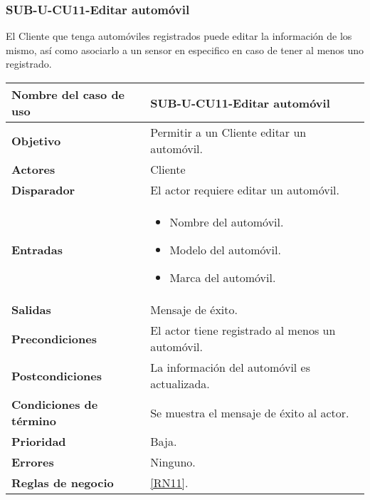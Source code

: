 \subsubsection{SUB-U-CU11-Editar automóvil}\label{SUB-U-CU11}
El Cliente que tenga automóviles registrados puede editar la información de los mismo, así como asociarlo a un sensor en especifico en caso de tener al menos uno registrado.

\begin{longtable}{|J{5cm}|J{10.3cm}|}
	\hline
	\textbf{Nombre del caso de uso} &
		SUB-U-CU11-Editar automóvil \\ \hline
	\textbf{Objetivo} &
		Permitir a un Cliente editar un automóvil. \\ \hline
	\textbf{Actores} &
		Cliente \\ \hline 
	\textbf{Disparador} & 
		El actor requiere editar un automóvil. \\ \hline 
	\textbf{Entradas} & 
		\begin{itemize}
				\item Nombre del automóvil.
				\item Modelo del automóvil.
				\item Marca del automóvil.
		\end{itemize}\\ \hline 
	\textbf{Salidas} & Mensaje de éxito.
		\\ \hline
	\textbf{Precondiciones} & El actor tiene registrado al menos un automóvil.
		\\ \hline
	\textbf{Postcondiciones} & La información del automóvil es actualizada.
		\\ \hline
	\textbf{Condiciones de término} & Se muestra el mensaje de éxito al actor.
		\\ \hline 
	\textbf{Prioridad} & 
		Baja. \\ \hline
	\textbf{Errores} & Ninguno.
		\\ \hline
	\textbf{Reglas de negocio} &  \ref{RN11}.
		 \\ \hline
\end{longtable}

